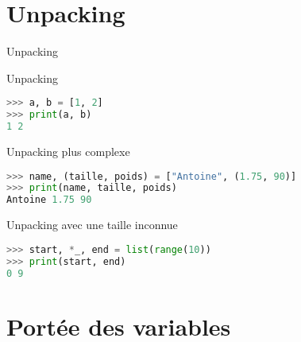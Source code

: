 \section{Unpacking}

\begin{frame}[fragile]{Unpacking}

  \begin{block}{Unpacking}
    \medskip
\begin{lstlisting}[language=Python, morekeywords={as, True}, numbers=none]
>>> a, b = [1, 2]
>>> print(a, b)
1 2
\end{lstlisting}
  \end{block}

  \begin{block}{Unpacking plus complexe}
    \medskip
\begin{lstlisting}[language=Python, morekeywords={as, True}, numbers=none]
>>> name, (taille, poids) = ["Antoine", (1.75, 90)]
>>> print(name, taille, poids)
Antoine 1.75 90
\end{lstlisting}
  \end{block}


  \begin{block}{Unpacking avec une taille inconnue}
    \medskip
\begin{lstlisting}[language=Python, morekeywords={as, True}, numbers=none]
>>> start, *_, end = list(range(10))
>>> print(start, end)
0 9
\end{lstlisting}
  \end{block}
\end{frame}



\section{Portée des variables}

